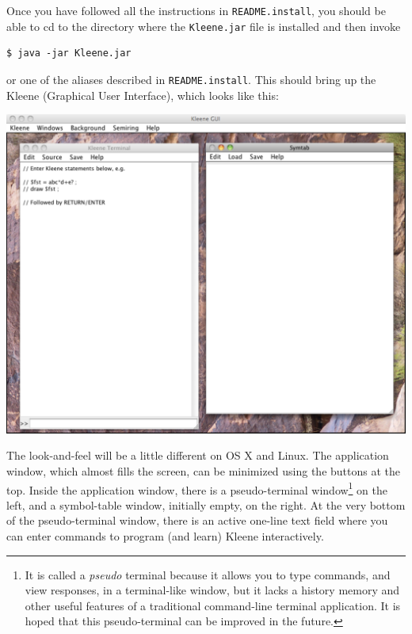 Once you have followed all the instructions in \texttt{README.install},
you should be able to cd to the directory where the \texttt{Kleene.jar}
file is installed and then invoke 

\begin{Verbatim}
$ java -jar Kleene.jar
\end{Verbatim}

\noindent
or one of the aliases described in \texttt{README.install}.
This should bring up the Kleene  (Graphical User Interface),
which looks like this:


\begin{center}
\includegraphics[width=135mm]{images/KleeneGUI.pdf}
\end{center}


The look-and-feel will be a little different on OS X and Linux.  The
application window, which almost fills the screen, can be minimized using
the buttons at the top.  Inside the application window, there is a
pseudo-terminal window\footnote{It is called a \emph{pseudo} terminal
because it allows you to type commands, and view responses, in a
terminal-like window, but it lacks a history memory and other useful
features of a traditional command-line terminal application.  It is hoped
that this pseudo-terminal can be improved in the future.}  on the left,
and a symbol-table window, initially empty, on the right.  At the very
bottom of the pseudo-terminal window, there is an active one-line text
field where you can enter commands to program (and learn) Kleene
interactively.  

